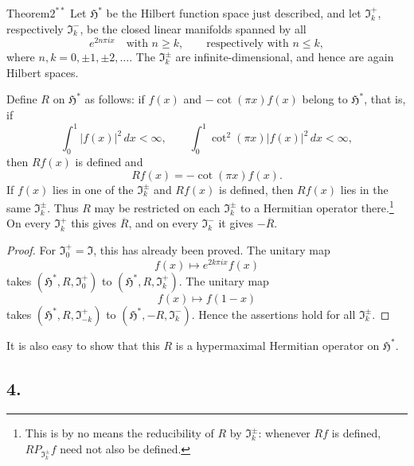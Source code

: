 ﻿\documentclass[paper=b5,fontsize=13pt,bookmarkpackage=false,twoside]{scrartcl}
\begin{document}
\begin{namedstatement}{Theorem}{\(2^{**}\)}
\label{thm:appIV-2}
Let \(\mathfrak H^*\) be the Hilbert function space just described, and
let \(\mathfrak I_k^+\), respectively \(\mathfrak I_k^-\), be the
closed linear manifolds spanned by all
\[
  e^{2n\pi ix}\quad\text{with }n\geq k,
  \qquad\text{respectively with }n\leq k,
\]
where \(n,k=0,\pm1,\pm2,\ldots\).  The
\(\mathfrak I_k^\pm\) are infinite-dimensional, and hence are again
Hilbert spaces.

Define \(R\) on \(\mathfrak H^*\) as follows: if
\(f(x)\) and \(-\cot(\pi x)f(x)\) belong to \(\mathfrak H^*\), that is,
if
\[
  \int_0^1|f(x)|^2\,dx<\infty,\qquad
  \int_0^1\cot^2(\pi x)|f(x)|^2\,dx<\infty,
\]
then \(Rf(x)\) is defined and
\[
  Rf(x)=-\cot(\pi x)f(x).
\]
If \(f(x)\) lies in one of the \(\mathfrak I_k^\pm\) and \(Rf(x)\) is
defined, then \(Rf(x)\) lies in the same
\(\mathfrak I_k^\pm\).  Thus \(R\) may be restricted on each
\(\mathfrak I_k^\pm\) to a Hermitian operator there.\footnote{\label{fn:77}This is
by no means the reducibility of \(R\) by
\(\mathfrak I_k^\pm\): whenever \(Rf\) is defined,
\(RP_{\mathfrak I_k^\pm}f\) need not also be defined.}
On every \(\mathfrak I_k^+\) this gives \(\overline R\), and on every
\(\mathfrak I_k^-\) it gives \(-\overline R\).
\end{namedstatement}

\begin{proof}
For \(\mathfrak I_0^+=\mathfrak I\), this has already been proved.
The unitary map
\[
  f(x)\longmapsto e^{2k\pi ix}f(x)
\]
takes
\((\mathfrak H^*,R,\mathfrak I_0^+)\) to
\((\mathfrak H^*,R,\mathfrak I_k^+)\).  The unitary map
\[
  f(x)\longmapsto f(1-x)
\]
takes \((\mathfrak H^*,R,\mathfrak I_{-k}^+)\) to
\((\mathfrak H^*,-R,\mathfrak I_k^-)\).  Hence the assertions hold for
all \(\mathfrak I_k^\pm\).
\end{proof}

It is also easy to show that this \(R\) is a hypermaximal Hermitian
operator on \(\mathfrak H^*\).

\subsection*{4.}
\label{appIV:4}
\end{document}
